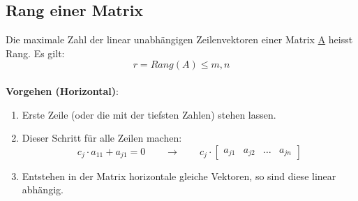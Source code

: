 \subsection{Rang einer Matrix}
Die maximale Zahl der linear unabhängigen Zeilenvektoren einer Matrix \underline{A} heisst Rang.
Es gilt:
\[
	r= Rang(A)\leq m,n
\]
\\
\textbf{Vorgehen (Horizontal)}:
\begin{enumerate}
 \item Erste Zeile (oder die mit der tiefsten Zahlen) stehen lassen.
 \item Dieser Schritt für alle Zeilen machen:
 \[
 	c_j\cdot a_{11} + a_{j1} = 0 \qquad \rightarrow \qquad
 	c_j \cdot \begin{bmatrix} a_{j1} & a_{j2} & \ldots & a_{jn}  \end{bmatrix} 
 \]
 \item Entstehen in der Matrix horizontale gleiche Vektoren, so sind diese linear abhängig.
\end{enumerate}

